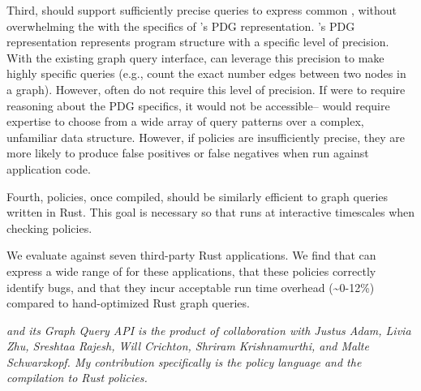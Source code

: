 Third, \syslang{} should support sufficiently precise queries to express common \policies{}, 
without overwhelming the \writer{} with the specifics of \sys{}'s PDG representation. 
%
\sys{}'s PDG representation represents program structure with a specific level of precision.
%
With the existing graph query interface, \writers{} can leverage this precision to make highly specific queries
(e.g., count the exact number edges between two nodes in a graph). 
%
However, \policies{} often do not require this level of precision.
%
If \syslang{} were to require reasoning about the PDG specifics, 
it would not be accessible--\ces{} would require expertise
to choose from a wide array of query patterns over a complex, unfamiliar data structure.
%
However, if policies are insufficiently precise, they are more likely to produce false positives or false negatives when run against application code.

Fourth, \syslang{} policies, once compiled, should be similarly efficient to graph queries written in Rust.
%
This goal is necessary so that \sys{} runs at interactive timescales when checking \syslang{} policies.

We evaluate \syslang{} against seven third-party Rust applications.
%
We find that \syslang{} can express a wide range of \policies{} for these applications,
that these policies correctly identify bugs,
and that they incur acceptable run time overhead (\textasciitilde{}0-12\%) compared to hand-optimized Rust graph queries.

\bigskip{}
\emph{\sys{} and its Graph Query API is the product of collaboration with Justus Adam, Livia Zhu, Sreshtaa Rajesh, 
Will Crichton, Shriram Krishnamurthi, and Malte Schwarzkopf.
My contribution specifically is the \syslang{} policy language and the compilation to Rust policies.}
